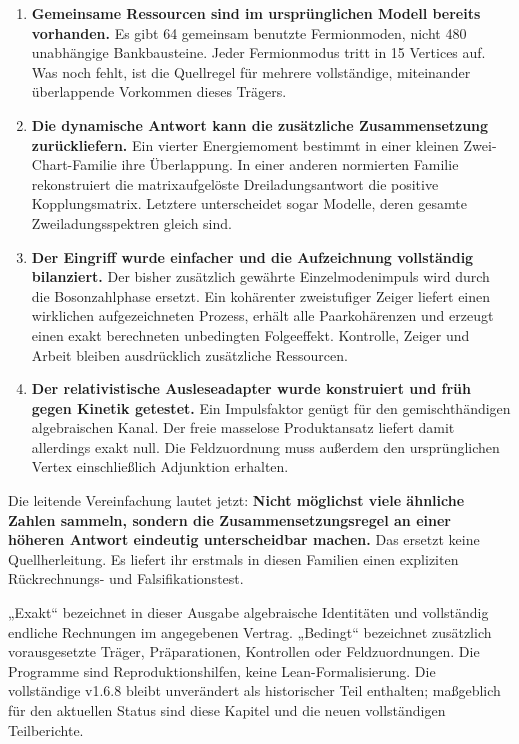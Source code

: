 \begin{enumerate}
\def\labelenumi{\arabic{enumi}.}
\tightlist
\item
  \textbf{Gemeinsame Ressourcen sind im ursprünglichen Modell bereits
  vorhanden.} Es gibt 64 gemeinsam benutzte Fermionmoden, nicht 480
  unabhängige Bankbausteine. Jeder Fermionmodus tritt in 15 Vertices
  auf. Was noch fehlt, ist die Quellregel für mehrere vollständige,
  miteinander überlappende Vorkommen dieses Trägers.
\item
  \textbf{Die dynamische Antwort kann die zusätzliche Zusammensetzung
  zurückliefern.} Ein vierter Energiemoment bestimmt in einer kleinen
  Zwei-Chart-Familie ihre Überlappung. In einer anderen normierten
  Familie rekonstruiert die matrixaufgelöste Dreiladungsantwort die
  positive Kopplungsmatrix. Letztere unterscheidet sogar Modelle, deren
  gesamte Zweiladungsspektren gleich sind.
\item
  \textbf{Der Eingriff wurde einfacher und die Aufzeichnung vollständig
  bilanziert.} Der bisher zusätzlich gewährte Einzelmodenimpuls wird
  durch die Bosonzahlphase ersetzt. Ein kohärenter zweistufiger Zeiger
  liefert einen wirklichen aufgezeichneten Prozess, erhält alle
  Paarkohärenzen und erzeugt einen exakt berechneten unbedingten
  Folgeeffekt. Kontrolle, Zeiger und Arbeit bleiben ausdrücklich
  zusätzliche Ressourcen.
\item
  \textbf{Der relativistische Ausleseadapter wurde konstruiert und früh
  gegen Kinetik getestet.} Ein Impulsfaktor genügt für den
  gemischthändigen algebraischen Kanal. Der freie masselose
  Produktansatz liefert damit allerdings exakt null. Die Feldzuordnung
  muss außerdem den ursprünglichen Vertex einschließlich Adjunktion
  erhalten.
\end{enumerate}

Die leitende Vereinfachung lautet jetzt: \textbf{Nicht möglichst viele
ähnliche Zahlen sammeln, sondern die Zusammensetzungsregel an einer
höheren Antwort eindeutig unterscheidbar machen.} Das ersetzt keine
Quellherleitung. Es liefert ihr erstmals in diesen Familien einen
expliziten Rückrechnungs- und Falsifikationstest.

„Exakt`` bezeichnet in dieser Ausgabe algebraische Identitäten und
vollständig endliche Rechnungen im angegebenen Vertrag. „Bedingt``
bezeichnet zusätzlich vorausgesetzte Träger, Präparationen, Kontrollen
oder Feldzuordnungen. Die Programme sind Reproduktionshilfen, keine
Lean-Formalisierung. Die vollständige v1.6.8 bleibt unverändert als
historischer Teil enthalten; maßgeblich für den aktuellen Status sind
diese Kapitel und die neuen vollständigen Teilberichte.


